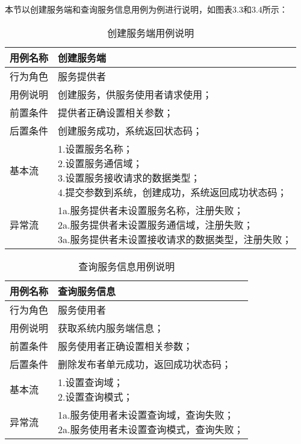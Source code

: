 本节以创建服务端和查询服务信息用例为例进行说明，如图表3.3和3.4所示：
\begin{table}[H]
  \centering\small
  \caption{创建服务端用例说明}
  \label{tab:exampletable}
  \begin{tabular}{ll}
    \toprule
    \multicolumn{1}{l}{用例名称} & \multicolumn{1}{l}{创建服务端}  \\
    \midrule
    行为角色 & 服务提供者\\
    用例说明 & 创建服务，供服务使用者请求使用；\\
    前置条件 & 提供者正确设置相关参数；\\
    后置条件 & 创建服务成功，系统返回状态码；\\
    基本流   & \makecell[l]{1.设置服务名称；\\2.设置服务通信域；\\3.设置服务接收请求的数据类型；\\4.提交参数到系统，创建成功，系统返回成功状态码；}\\
    异常流   & \makecell[l]{1a.服务提供者未设置服务名称，注册失败；\\2a.服务提供者未设置服务通信域，注册失败；\\3a.服务提供者未设置接收请求的数据类型，注册失败；}\\
    \bottomrule
  \end{tabular}
\end{table}
\begin{table}[H]
  \centering\small
  \caption{查询服务信息用例说明}
  \label{tab:exampletable}
  \begin{tabular}{ll}
    \toprule
    \multicolumn{1}{l}{用例名称} & \multicolumn{1}{l}{查询服务信息}  \\
    \midrule
    行为角色 & 服务使用者\\
    用例说明 & 获取系统内服务端信息；\\
    前置条件 & 服务使用者正确设置相关参数；\\
    后置条件 & 删除发布者单元成功，返回成功状态码；\\
    基本流   & \makecell[l]{1.设置查询域；\\2.设置查询模式；}\\
    异常流   & \makecell[l]{1a.服务使用者未设置查询域，查询失败；\\2a.服务使用者未设置查询模式，查询失败；}\\
    \bottomrule
  \end{tabular}
\end{table}



